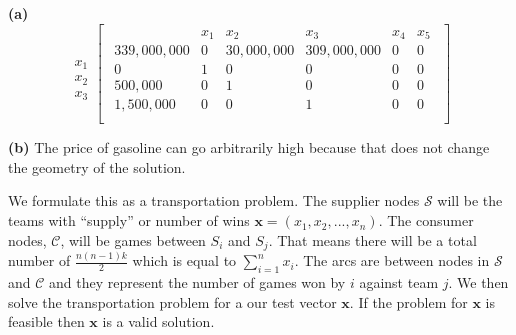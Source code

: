 \documentclass[12pt]{article}
\newcommand{\matr}[1]{\mathbf{#1}}
\newenvironment{problem}[2][Problem]{\begin{trivlist}
\item[\hskip \labelsep {\bfseries #1}\hskip \labelsep {\bfseries #2.}]}{\end{trivlist}}
\newenvironment{subproblem}[1]{\textbf{(#1)}}{}
\theoremstyle{definition}
\begin{document}
\begin{problem}{5}

\begin{subproblem}{a}
\begin{equation}
\begin{array}{c}
\\
  \\
x_1 \\
x_2 \\
x_3
\end{array}
\begin{bmatrix} %
\begin{array}{c|ccccc}
    & x_1 & x_2 & x_3 & x_4 & x_5 \\ \hline
  339,000,000 & 0 & 30,000,000 & 309,000,000 & 0 & 0 \\ \hline
  0 & 1 & 0 & 0 & 0 & 0  \\
  500,000 & 0 & 1 & 0 & 0 & 0  \\
  1,500,000 & 0 & 0 & 1 & 0 & 0  \\
\end{array}
\end{bmatrix}
\end{equation}
$ $ \\
\end{subproblem}

\begin{subproblem}{b}
The price of gasoline can go arbitrarily high because that does not change the geometry of the solution.
\end{subproblem}
\end{problem}

\begin{problem}{6}
We formulate this as a transportation problem.
The supplier nodes $\mathcal{S}$ will be the teams with ``supply'' or number of wins $\matr{x}=(x_1, x_2, ..., x_n)$.
The consumer nodes, $\mathcal{C}$, will be games between $S_i$ and $S_j$.
That means there will be a total number of $\frac{n(n-1)k}{2}$ which is equal to $\sum_{i=1}^n x_i$.
The arcs are between nodes in $\mathcal{S}$ and $\mathcal{C}$ and they represent the number of games won by $i$ against team $j$.
We then solve the transportation problem for a our test vector $\matr{x}$.
If the problem for $\matr{x}$ is feasible then $\matr{x}$ is a valid solution.
\end{problem}
\end{document}

